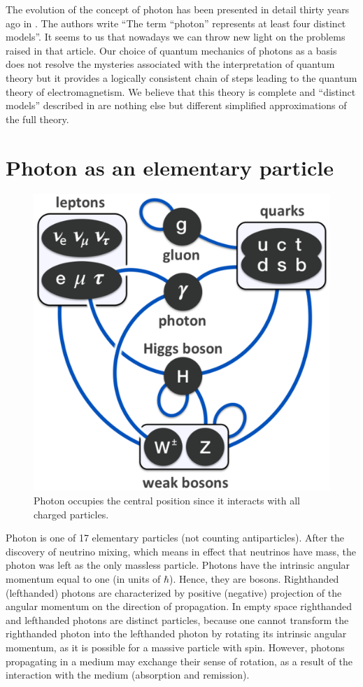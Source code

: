 \documentclass[onecolumn,aps,pra,12pt]{revtex4-1}
\begin{document}
The evolution of the concept of photon has been presented in detail thirty years ago in \cite{kaa}. The authors write ``The term ``photon'' represents at least four distinct models''. It seems to us that nowadays we can throw new light on the problems raised in that article. Our choice of quantum mechanics of photons as a basis does not resolve the mysteries associated with the interpretation of quantum theory but it provides a logically consistent chain of steps leading to the quantum theory of electromagnetism. We believe that this theory is complete and ``distinct models'' described in \cite{kaa} are nothing else but different simplified approximations of the full theory.

\section{Photon as an elementary particle}

\begin{figure}
\includegraphics[scale=0.45]{Fig1.eps}
\caption{Photon occupies the central position since it interacts with all charged particles.}
\end{figure}

Photon is one of 17 elementary particles (not counting antiparticles). After the discovery of neutrino mixing, which means in effect that neutrinos have mass, the photon was left as the only massless particle. Photons have the intrinsic angular momentum equal to one (in units of $\hbar$). Hence, they are bosons. Righthanded (lefthanded) photons are characterized by positive (negative) projection of the angular momentum on the direction of propagation. In empty space righthanded and lefthanded photons are distinct particles, because one cannot transform the righthanded photon into the lefthanded photon by rotating its intrinsic angular momentum, as it is possible for a massive particle with spin. However, photons propagating in a medium may exchange their sense of rotation, as a result of the interaction with the medium (absorption and remission).
\end{document}
